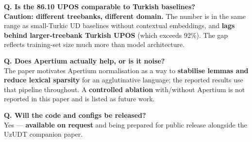 \documentclass[12pt,a4paper]{article}
\begin{document}
\vspace{0.4em}
\noindent\textbf{Q. Is the 86.10 UPOS comparable to Turkish baselines?}\\
\textbf{Caution: different treebanks, different domain.} The number is
in the same range as small-Turkic UD baselines without contextual
embeddings, and \textbf{lags behind larger-treebank Turkish UPOS} (which
exceeds 92\%). The gap reflects training-set size much more than model
architecture.

\vspace{0.4em}
\noindent\textbf{Q. Does Apertium actually help, or is it noise?}\\
The paper motivates Apertium normalisation as a way to \textbf{stabilise
lemmas and reduce lexical sparsity} for an agglutinative language; the
reported results use that pipeline throughout. A \textbf{controlled
ablation} with/without Apertium is not reported in this paper and is
listed as future work.

\vspace{0.4em}
\noindent\textbf{Q. Will the code and configs be released?}\\
Yes --- \textbf{available on request} and being prepared for public
release alongside the UzUDT companion paper.
\end{document}
